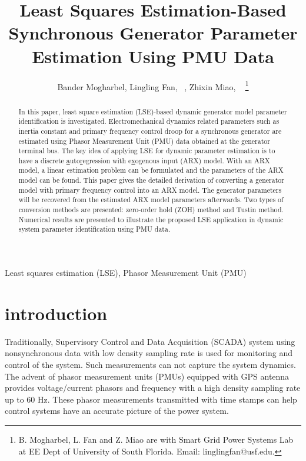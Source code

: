 \documentclass[10pt,journal,final]{IEEEtran}
\begin{document}
\title{Least Squares Estimation-Based Synchronous Generator Parameter Estimation Using PMU Data}
\author{Bander Mogharbel, Lingling Fan, ~, Zhixin Miao, ~ \thanks{B. Mogharbel, L. Fan and Z. Miao are with Smart Grid Power Systems Lab at EE Dept of University of South Florida. Email: linglingfan@usf.edu. }}
\maketitle


\begin{abstract}
In this paper, least square estimation (LSE)-based dynamic generator model parameter identification is investigated. Electromechanical dynamics related parameters such as inertia constant and primary frequency control droop for a synchronous generator are estimated using Phasor Measurement Unit (PMU) data obtained at the generator terminal bus. The key idea of applying LSE for dynamic parameter estimation is to have a discrete \underline{a}uto\underline{r}egression with e\underline{x}ogenous input (ARX) model. With an ARX model, a linear estimation problem can be formulated and the parameters of the ARX model can be found. This paper gives the detailed derivation of converting a generator model with primary frequency control into an ARX model. The generator parameters will be recovered from the estimated ARX model parameters afterwards. Two types of conversion methods are presented: zero-order hold (ZOH) method and Tustin method. Numerical results are presented to illustrate the proposed LSE application in dynamic system parameter identification using PMU data.
\end{abstract}

\begin{IEEEkeywords}
Least squares estimation (LSE), Phasor Measurement Unit (PMU)
\end{IEEEkeywords}







\section{introduction}
\label{intro}

Traditionally, Supervisory Control and Data Acquisition (SCADA) system using nonsynchronous data with low density sampling rate is used for monitoring and control of the system. Such measurements can not capture the system dynamics. The advent of phasor measurement units (PMUs) equipped with GPS antenna provides voltage/current phasors and frequency with a high density sampling rate up to 60 Hz. These phasor measurements transmitted with time stamps can help control systems have an accurate picture of the power system.\par
\end{document}
